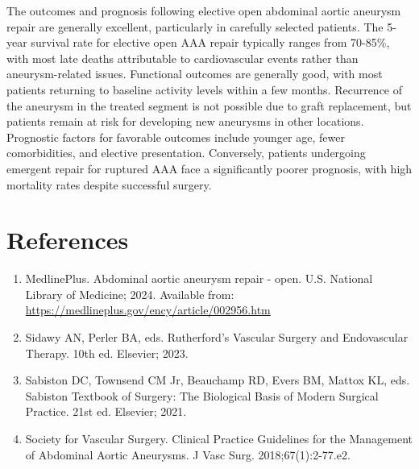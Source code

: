 The outcomes and prognosis following elective open abdominal aortic aneurysm repair are generally excellent, particularly in carefully selected patients. The 5-year survival rate for elective open AAA repair typically ranges from 70-85\%, with most late deaths attributable to cardiovascular events rather than aneurysm-related issues. Functional outcomes are generally good, with most patients returning to baseline activity levels within a few months. Recurrence of the aneurysm in the treated segment is not possible due to graft replacement, but patients remain at risk for developing new aneurysms in other locations. Prognostic factors for favorable outcomes include younger age, fewer comorbidities, and elective presentation. Conversely, patients undergoing emergent repair for ruptured AAA face a significantly poorer prognosis, with high mortality rates despite successful surgery.

\section*{References}
\begin{enumerate}
  \item MedlinePlus. Abdominal aortic aneurysm repair - open. U.S. National Library of Medicine; 2024. Available from: \url{https://medlineplus.gov/ency/article/002956.htm}
  
  \item Sidawy AN, Perler BA, eds. Rutherford's Vascular Surgery and Endovascular Therapy. 10th ed. Elsevier; 2023.
  
  \item Sabiston DC, Townsend CM Jr, Beauchamp RD, Evers BM, Mattox KL, eds. Sabiston Textbook of Surgery: The Biological Basis of Modern Surgical Practice. 21st ed. Elsevier; 2021.
  
  \item Society for Vascular Surgery. Clinical Practice Guidelines for the Management of Abdominal Aortic Aneurysms. J Vasc Surg. 2018;67(1):2-77.e2.
\end{enumerate}

\clearpage
